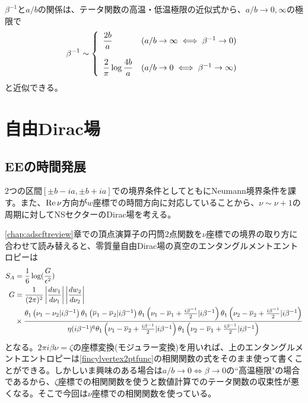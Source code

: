 $\beta^{-1}$と$a/b$の関係は、テータ関数の高温・低温極限の近似式から、$a/b\to 0,\infty$の極限で
\begin{align}
\beta^{-1}\sim \left\{ \begin{array}{ll}
\bigskip \dfrac{2b}{a} & (a/b\to \infty\iff \beta^{-1}\to 0)\\
\dfrac{2}{\pi}\log\dfrac{4b}{a} & (a/b\to 0\iff \beta^{-1}\to \infty)
\end{array}\right.
\end{align}
と近似できる。

\section{自由Dirac場}\label{sec:DSQdirac}
\subsection{EEの時間発展}
$2$つの区間$[\pm b-ia,\pm b+ia]$での境界条件としてともにNeumann境界条件を課す。また、$\text{Re}\, \nu$方向が$w$座標での時間方向に対応していることから、$\nu\sim \nu+1$の周期に対してNSセクターのDirac場を考える。

\ref{chap:adscftreview}章での頂点演算子の円筒$2$点関数を$\nu$座標での境界の取り方に合わせて読み替えると、零質量自由Dirac場の真空のエンタングルメントエントロピーは
\begin{align}
S_A &=\frac{1}{6}\log(\frac{G}{\epsilon^2})\\
G&=\frac{1}{(2\pi)^2}\left|\frac{dw_1}{d\nu_1}\right|\left|\frac{dw_2}{d\nu_2}\right|\notag\\
&\times \frac{\theta_1\left(\nu_1-\nu_2|i\beta^{-1}\right)\theta_1
	\left(\overline{\nu}_1-\overline{\nu}_2|i\beta^{-1}\right)\theta_1\left(\nu_1-\overline{\nu}_1+\frac{i\beta^{-1}}{2}|i\beta^{-1}\right)\theta_1\left(\nu_2-\overline{\nu}_2+\frac{i\beta^{-1}}{2}|i\beta^{-1}\right)}{\eta(i\beta^{-1})^6 \theta_1\left(\nu_1-\overline{\nu}_2+\frac{i\beta^{-1}}{2}|i\beta^{-1}\right)\theta_1
	\left(\nu_2-\overline{\nu}_1+\frac{i\beta^{-1}}{2}|i\beta^{-1}\right)}
\end{align}
となる。$2\pi i\beta \nu=\zeta$の座標変換(モジュラー変換)を用いれば、上のエンタングルメントエントロピーは\ref{fincylvertex2ptfunc}の相関関数の式をそのまま使って書くことができる。しかしいま興味のある場合は$a/b\to 0 \iff \beta\to 0$の``高温極限"の場合であるから、$\zeta$座標での相関関数を使うと数値計算でのテータ関数の収束性が悪くなる。そこで今回は$\nu$座標での相関関数を使っている。

